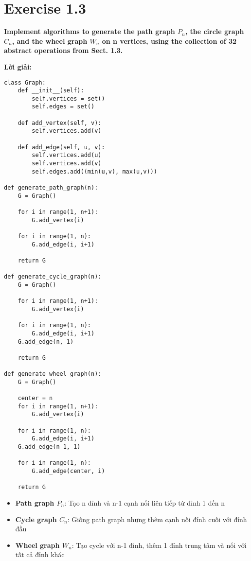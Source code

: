 \documentclass[12pt]{article}
\begin{document}
\section{Exercise 1.3}
\textbf{Implement algorithms to generate the path graph $P_n$, the circle graph $C_n$, and the wheel graph $W_n$ on n vertices, using the collection of 32 abstract operations from Sect. 1.3.}

\textbf{Lời giải:}

\begin{lstlisting}
class Graph:
    def __init__(self):
        self.vertices = set()
        self.edges = set()
    
    def add_vertex(self, v):
        self.vertices.add(v)
    
    def add_edge(self, u, v):
        self.vertices.add(u)
        self.vertices.add(v)
        self.edges.add((min(u,v), max(u,v)))

def generate_path_graph(n):
    G = Graph()
    
    for i in range(1, n+1):
        G.add_vertex(i)
    
    for i in range(1, n):
        G.add_edge(i, i+1)
    
    return G

def generate_cycle_graph(n):
    G = Graph()
    
    for i in range(1, n+1):
        G.add_vertex(i)
    
    for i in range(1, n):
        G.add_edge(i, i+1)
    G.add_edge(n, 1)
    
    return G

def generate_wheel_graph(n):
    G = Graph()
    
    center = n
    for i in range(1, n+1):
        G.add_vertex(i)
    
    for i in range(1, n):
        G.add_edge(i, i+1)
    G.add_edge(n-1, 1)
    
    for i in range(1, n):
        G.add_edge(center, i)
    
    return G
\end{lstlisting}

\begin{itemize}
    \item \textbf{Path graph $P_n$}: Tạo n đỉnh và n-1 cạnh nối liên tiếp từ đỉnh 1 đến n
    \item \textbf{Cycle graph $C_n$}: Giống path graph nhưng thêm cạnh nối đỉnh cuối với đỉnh đầu
    \item \textbf{Wheel graph $W_n$}: Tạo cycle với n-1 đỉnh, thêm 1 đỉnh trung tâm và nối với tất cả đỉnh khác
\end{itemize}
\end{document}
